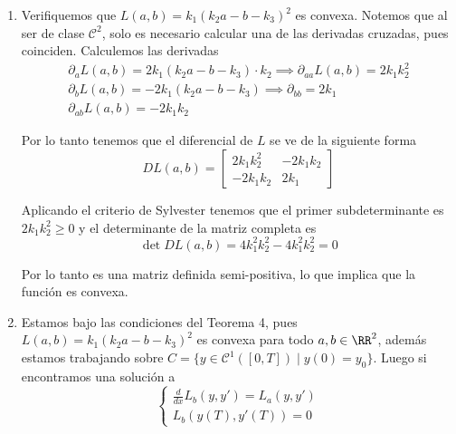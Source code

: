 \documentclass[a4paper,oneside,10.5pt]{USMArt}
\begin{document}
\begin{sol}
\begin{enumerate}
  \item Verifiquemos que $L(a, b) = k_{1}(k_{2}a - b - k_{3})^{2}$ es convexa.
        Notemos que al ser de clase $\mathcal{C}^{2}$, solo es necesario calcular una de las
        derivadas cruzadas, pues coinciden. Calculemos las derivadas
        \begin{gather*}
          \partial_{a} L(a, b) = 2k_{1}(k_{2}a - b -k_{3}) \cdot k_{2} \implies \partial_{aa}L(a, b) = 2k_{1}k_{2}^{2}\\
          \partial_{b} L(a, b) = -2k_{1}(k_{2}a - b - k_{3}) \implies \partial_{bb} = 2k_{1}\\
          \partial_{ab} L(a, b) = -2k_{1}k_{2}
        \end{gather*}

        Por lo tanto tenemos que el diferencial de $L$ se ve de la siguiente forma
        \begin{equation*}
          DL(a, b) = \begin{bmatrix}
            2k_{1}k_{2}^{2} & -2k_{1}k_{2}\\
            -2k_{1}k_{2}    & 2k_{1}
                     \end{bmatrix}
        \end{equation*}

        Aplicando el criterio de Sylvester tenemos que el primer subdeterminante es $2k_{1}k_{2}^{2} \geq 0$ y
        el determinante de la matriz completa es
        \begin{equation*}
          \det DL(a, b) = 4k_{1}^{2}k_{2}^{2} - 4k_{1}^{2}k_{2}^{2} = 0
        \end{equation*}

        Por lo tanto es una matriz definida semi-positiva, lo que implica que la función es convexa.

  \item Estamos bajo las condiciones del Teorema 4, pues $L(a, b) = k_{1}(k_{2}a - b -k_{3})^{2}$ es convexa
        para todo $a, b \in \RR^{2}$, además estamos trabajando sobre $C = \{y \in \mathcal{C}^{1}([0, T]) \; | \; y(0) = y_{0}\}$. Luego si encontramos una solución a
        \begin{equation*}
        \begin{cases}
          \frac{d}{dx} L_b(y, y') = L_{a}(y, y')\\
          L_{b}(y(T), y'(T)) = 0
        \end{cases}
        \end{equation*}


\end{enumerate}
\end{sol}
\end{document}
